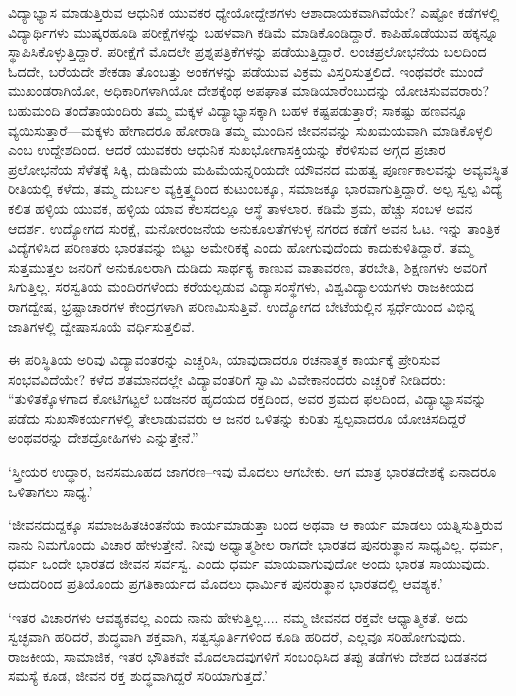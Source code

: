 ವಿದ್ಯಾಭ್ಯಾಸ ಮಾಡುತ್ತಿರುವ ಆಧುನಿಕ ಯುವಕರ ಧ್ಯೇಯೋದ್ದೇಶಗಳು ಆಶಾದಾಯಕ\-ವಾಗಿವೆಯೇ? ಎಷ್ಟೋ ಕಡೆಗಳಲ್ಲಿ ವಿದ್ಯಾರ್ಥಿಗಳು ಮುಷ್ಕರಹೂಡಿ ಪರೀಕ್ಷೆಗಳನ್ನು ಬಹಳವಾಗಿ ಕಡಿಮೆ ಮಾಡಿಕೊಂಡಿದ್ದಾರೆ. ಕಾಪಿಹೊಡೆಯುವ ಹಕ್ಕನ್ನೂ ಸ್ಥಾಪಿಸಿಕೊಳ್ಳುತ್ತಿದ್ದಾರೆ. ಪರೀಕ್ಷೆಗೆ ಮೊದಲೇ ಪ್ರಶ್ನಪತ್ರಿಕೆಗಳನ್ನು ಪಡೆಯುತ್ತಿದ್ದಾರೆ. ಲಂಚಪ್ರಲೋಭನೆಯ ಬಲದಿಂದ ಓದದೇ, ಬರೆಯದೇ ಶೇಕಡಾ ತೊಂಬತ್ತು ಅಂಕಗಳನ್ನು ಪಡೆಯುವ ವಿಕ್ರಮ ವಿಸ್ತರಿಸುತ್ತಲಿದೆ. ಇಂಥವರೇ ಮುಂದೆ ಮುಖಂಡ\-ರಾಗಿಯೋ, ಅಧಿಕಾರಿಗಳಾಗಿಯೋ ದೇಶಕ್ಕೆಂಥ ಅಪಘಾತ ಮಾಡಿಯಾ\-ರೆಂಬು\-ದನ್ನು ಯೋಚಿಸುವವರಾರು? ಬಹುಮಂದಿ ತಂದೆತಾಯಂದಿರು ತಮ್ಮ ಮಕ್ಕಳ ವಿದ್ಯಾಭ್ಯಾಸಕ್ಕಾಗಿ ಬಹಳ ಕಷ್ಟಪಡುತ್ತಾರೆ; ಸಾಕಷ್ಟು ಹಣವನ್ನೂ ವ್ಯಯಿಸುತ್ತಾರೆ—ಮಕ್ಕಳು ಹೇಗಾದರೂ ಹೋರಾಡಿ ತಮ್ಮ ಮುಂದಿನ ಜೀವನವನ್ನು ಸುಖಮಯವಾಗಿ ಮಾಡಿಕೊಳ್ಳಲಿ ಎಂಬ ಉದ್ದೇಶದಿಂದ. ಆದರೆ ಯುವಕರು ಆಧುನಿಕ ಸುಖಭೋಗಾಸಕ್ತಿಯನ್ನು ಕೆರಳಿಸುವ ಅಗ್ಗದ ಪ್ರಚಾರ ಪ್ರಲೋಭನೆಯ ಸೆಳೆತಕ್ಕೆ ಸಿಕ್ಕಿ, ದುಡಿಮೆಯ ಮಹಿಮೆಯನ್ನರಿಯದೇ ಯೌವನದ ಮಹತ್ವ ಪೂರ್ಣಕಾಲವನ್ನು ಅವ್ಯವಸ್ಥಿತ ರೀತಿಯಲ್ಲಿ ಕಳೆದು, ತಮ್ಮ ದುರ್ಬಲ ವ್ಯಕ್ತಿತ್ತ್ವದಿಂದ ಕುಟುಂಬಕ್ಕೂ, ಸಮಾಜಕ್ಕೂ ಭಾರವಾಗುತ್ತಿದ್ದಾರೆ. ಅಲ್ಪ ಸ್ವಲ್ಪ ವಿದ್ಯೆ ಕಲಿತ ಹಳ್ಳಿಯ ಯುವಕ, ಹಳ್ಳಿಯ ಯಾವ ಕೆಲಸದಲ್ಲೂ ಆಸ್ಥೆ ತಾಳಲಾರ. ಕಡಿಮೆ ಶ್ರಮ, ಹೆಚ್ಚು ಸಂಬಳ ಅವನ ಆದರ್ಶ. ಉದ್ಯೋಗದ ಸುರಕ್ಷೆ, ಮನೋರಂಜನೆಯ ಅನುಕೂಲತೆಗಳುಳ್ಳ ನಗರದ ಕಡೆಗೆ ಅವನ ಓಟ. ಇನ್ನು ತಾಂತ್ರಿಕ ವಿದ್ಯೆಗಳಿಸಿದ ಪರಿಣತರು ಭಾರತವನ್ನು ಬಿಟ್ಟು ಅಮೇರಿಕಕ್ಕೆ ಎಂದು ಹೋಗುವುದೆಂದು ಕಾದುಕುಳಿತಿದ್ದಾರೆ. ತಮ್ಮ ಸುತ್ತಮುತ್ತಲ ಜನರಿಗೆ ಅನುಕೂಲರಾಗಿ ದುಡಿದು ಸಾರ್ಥಕ್ಯ ಕಾಣುವ ವಾತಾವರಣ, ತರಬೇತಿ, ಶಿಕ್ಷಣಗಳು ಅವರಿಗೆ ಸಿಗುತ್ತಿಲ್ಲ. ಸರಸ್ವತಿಯ ಮಂದಿರಗಳೆಂದು ಕರೆಯಲ್ಪಡುವ ವಿದ್ಯಾಸಂಸ್ಥೆಗಳು, ವಿಶ್ವವಿದ್ಯಾಲಯಗಳು ರಾಜಕೀಯದ ರಾಗದ್ವೇಷ, ಭ್ರಷ್ಟಾಚಾರಗಳ ಕೇಂದ್ರಗಳಾಗಿ ಪರಿಣಮಿಸುತ್ತಿವೆ. ಉದ್ಯೋಗದ ಬೇಟೆಯಲ್ಲಿನ ಸ್ಪರ್ಧೆಯಿಂದ ವಿಭಿನ್ನ ಜಾತಿಗಳಲ್ಲಿ ದ್ವೇಷಾಸೂಯೆ ವರ್ಧಿಸುತ್ತಲಿವೆ.

ಈ ಪರಿಸ್ಥಿತಿಯ ಅರಿವು ವಿದ್ಯಾವಂತರನ್ನು ಎಚ್ಚರಿಸಿ, ಯಾವುದಾದರೂ ರಚನಾತ್ಮಕ ಕಾರ್ಯಕ್ಕೆ ಪ್ರೇರಿಸುವ ಸಂಭವವಿದೆಯೇ? ಕಳೆದ ಶತಮಾನದಲ್ಲೇ ವಿದ್ಯಾವಂತರಿಗೆ ಸ್ವಾಮಿ ವಿವೇಕಾನಂದರು ಎಚ್ಚರಿಕೆ ನೀಡಿದರು: “ತುಳಿತಕ್ಕೊಳಗಾದ ಕೋಟಿಗಟ್ಟಲೆ ಬಡಜನರ ಹೃದಯದ ರಕ್ತದಿಂದ, ಅವರ ಶ್ರಮದ ಫಲದಿಂದ, ವಿದ್ಯಾಭ್ಯಾಸವನ್ನು ಪಡೆದು ಸುಖಸೌಕರ್ಯಗಳಲ್ಲಿ ತೇಲಾಡುವವರು ಆ ಜನರ ಒಳಿತನ್ನು ಕುರಿತು ಸ್ವಲ್ಪವಾದರೂ ಯೋಚಿಸದಿದ್ದರೆ ಅಂಥವರನ್ನು ದೇಶದ್ರೋಹಿಗಳು ಎನ್ನುತ್ತೇನೆ.”

‘ಸ್ತ್ರೀಯರ ಉದ್ಧಾರ, ಜನಸಮೂಹದ ಜಾಗರಣ–ಇವು ಮೊದಲು ಆಗಬೇಕು. ಆಗ ಮಾತ್ರ ಭಾರತದೇಶಕ್ಕೆ ಏನಾದರೂ ಒಳಿತಾಗಲು ಸಾಧ್ಯ.’

‘ಜೀವನದುದ್ದಕ್ಕೂ ಸಮಾಜಹಿತಚಿಂತನೆಯ ಕಾರ್ಯಮಾಡುತ್ತಾ ಬಂದ ಅಥವಾ ಆ ಕಾರ್ಯ ಮಾಡಲು ಯತ್ನಿಸುತ್ತಿರುವ ನಾನು ನಿಮಗೊಂದು ವಿಚಾರ ಹೇಳುತ್ತೇನೆ. ನೀವು ಅಧ್ಯಾತ್ಮಶೀಲ ರಾಗದೇ ಭಾರತದ ಪುನರುತ್ಥಾನ ಸಾಧ್ಯವಿಲ್ಲ. ಧರ್ಮ, ಧರ್ಮ ಒಂದೇ ಭಾರತದ ಜೀವನ ಸರ್ವಸ್ವ. ಎಂದು ಧರ್ಮ ಮಾಯವಾಗುವುದೋ ಅಂದು ಭಾರತ ಸಾಯುವುದು. ಆದುದರಿಂದ ಪ್ರತಿಯೊಂದು ಪ್ರಗತಿಕಾರ್ಯದ ಮೊದಲು ಧಾರ್ಮಿಕ ಪುನರುತ್ಥಾನ ಭಾರತದಲ್ಲಿ ಆವಶ್ಯಕ.’

‘ಇತರ ವಿಚಾರಗಳು ಆವಶ್ಯಕವಲ್ಲ ಎಂದು ನಾನು ಹೇಳುತ್ತಿಲ್ಲ.... ನಮ್ಮ ಜೀವನದ ರಕ್ತವೇ ಆಧ್ಯಾತ್ಮಿಕತೆ. ಅದು ಸ್ವಚ್ಛವಾಗಿ ಹರಿದರೆ, ಶುದ್ಧವಾಗಿ ಶಕ್ತವಾಗಿ, ಸತ್ವಸ್ಫೂರ್ತಿಗಳಿಂದ ಕೂಡಿ ಹರಿದರೆ, ಎಲ್ಲವೂ ಸರಿಹೋಗುವುದು. ರಾಜಕೀಯ, ಸಾಮಾಜಿಕ, ಇತರ ಭೌತಿಕವೇ ಮೊದಲಾದವುಗಳಿಗೆ ಸಂಬಂಧಿಸಿದ ತಪ್ಪು ತಡೆಗಳು ದೇಶದ ಬಡತನದ ಸಮಸ್ಯೆ ಕೂಡ, ಜೀವನ ರಕ್ತ ಶುದ್ಧವಾಗಿದ್ದರೆ ಸರಿಯಾಗುತ್ತದೆ.’

